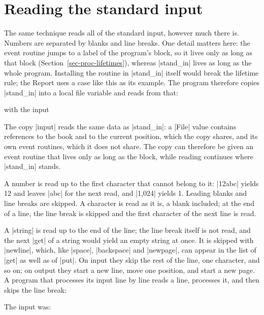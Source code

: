 \section{Reading the standard input}\label{sec-stand-in}

The same technique reads all of the standard input, however much there
is. Numbers are separated by blanks and line breaks. One detail matters
here: the event routine jumps to a label of the program's block, so it
lives only as long as that block (Section~\ref{sec-proc-lifetimes}),
whereas \code|stand_in| lives as long as the whole program. Installing
the routine in \code|stand_in| itself would break the lifetime rule; the
Report uses a case like this as its example. The program therefore
copies \code|stand_in| into a local file variable and reads from that:


\noindent with the input


The copy \code|input| reads the same data as \code|stand_in|: a
\code|File| value contains references to the book and to the current
position, which the copy shares, and its own event routines, which it
does not share. The copy can therefore be given an event routine that
lives only as long as the block, while reading continues where
\code|stand_in| stands.

A number is read up to the first character that cannot belong to it:
\code|12abc| yields 12 and leaves \code|abc| for the next read, and
\code|1,024| yields 1. Leading blanks and line breaks are skipped. A
character is read as it is, a blank included; at the end of a line, the
line break is skipped and the first character of the next line is read.

A \code|string| is read up to the end of the line; the line break itself
is not read, and the next \code|get| of a string would yield an empty
string at once. It is skipped with \code|newline|, which, like
\code|space|, \code|backspace| and \code|newpage|, can appear in the list
of \code|get| as well as of \code|put|. On input they skip the rest of
the line, one character, and so on; on output they start a new line,
move one position, and start a new page. A program that processes its
input line by line reads a line, processes it, and then skips the line
break:


\noindent The input was:


